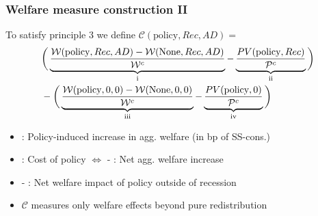 \documentclass[pdflatex,aspectratio=169]{beamer}
\newcommand{\RNum}[1]{\uppercase\expandafter{\romannumeral #1\relax}}
\begin{document}
\begin{frame}
	\frametitle{Welfare measure construction II}
	\hypertarget{WelfareMeasure1}{}
	
	
	To satisfy principle 3 we define $\mathcal{C}(\text{policy},Rec,AD) =$
	\begin{equation}\begin{gathered}\begin{aligned}
		& \bigg( \underbrace{\frac{\mathcal{W}(\text{policy},Rec,AD)-\mathcal{W}(\text{None},Rec,AD)}{\mathcal{W}^c}}_\text{\RNum{1}}  - \underbrace{\frac{PV(\text{policy},Rec)}{\mathcal{P}^c} }_\text{\RNum{2}} \bigg) \nonumber \\  
		& -
		\bigg( \underbrace{\frac{\mathcal{W}(\text{policy},0,0) - \mathcal{W}(\text{None},0,0)}{\mathcal{W}^c}}_\text{\RNum{3}}  - \underbrace{\frac{PV(\text{policy},0)}{\mathcal{P}^c}}_\text{\RNum{4}}  \bigg) 
	\end{aligned}\end{gathered}\end{equation}
	
	\begin{itemize}[<+->]
		\item \RNum{1}: Policy-induced increase in agg. welfare (in bp of SS-cons.)
		\item \RNum{2}: Cost of policy $\Leftrightarrow$ \RNum{1} - \RNum{2}: Net agg. welfare increase
		\item \RNum{3} - \RNum{4}: Net welfare impact of policy outside of recession
		\item $\mathcal{C}$ measures only welfare effects beyond pure redistribution
	\end{itemize}
	
\end{frame}
	
\end{document}
